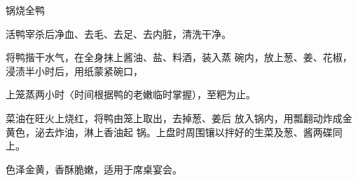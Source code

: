 \begin{recipe}{锅烧全鸭}

\ingredients


\cooking

\step 	活鸭宰杀后净血、去毛、去足、去内脏，清洗干净。

\step 	将鸭揩干水气，在全身抹上酱油、盐、料酒，装入蒸 碗内，放上葱、姜、花椒，浸渍半小时后，用纸蒙紧碗口，

上笼蒸两小时〈时间根据鸭的老嫩临时掌握），至粑为止。

\step 菜油在旺火上烧红，将鸭由笼上取出，去掉葱、姜后 放入锅内，用瓢翻动炸成金黄色，泌去炸油，淋上香油起 锅。上盘时周围镶以拌好的生菜及葱、酱两碟同上。

\notes

色泽金黄，香酥脆嫩，适用于席桌宴会。

\end{recipe}

